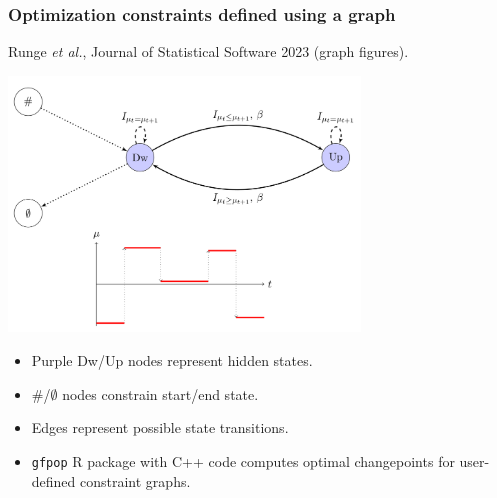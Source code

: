 \documentclass{beamer}
\newcommand{\RR}{\mathbb R}
\begin{document}
\begin{frame}
  \frametitle{Optimization constraints defined using a graph}
  Runge \emph{et al.}, Journal of Statistical Software 2023 (graph figures).

  \includegraphics[width=0.7\textwidth]{gfpop-up-down}

  \begin{itemize}
  \item Purple Dw/Up nodes represent hidden states.
  \item \#/$\emptyset$ nodes constrain start/end state.
  \item Edges represent possible state transitions.
  \item \texttt{gfpop} R package with C++ code computes optimal
    changepoints for user-defined constraint graphs.
  \end{itemize}

\end{frame}



\end{document}
